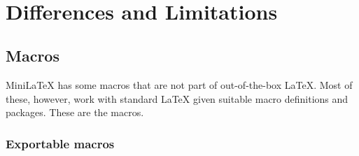 \begin{verbatim}
  
\end{verbatim}

\section{Differences and Limitations}

\subsection{Macros}

MiniLaTeX has some macros that are not part of out-of-the-box LaTeX. Most of these, however, work with standard LaTeX given suitable macro definitions and packages. These are the  macros.

\subsubsection{Exportable macros}

